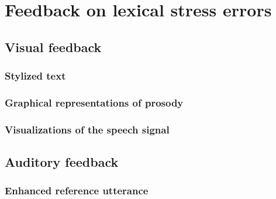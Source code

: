 %
%
\chapter{Feedback on lexical stress errors}
\label{chap:feedback}


 	\citep{Hattie2007}


%


\section{Visual feedback}
\label{sec:fb:visual}

	\subsection{Stylized text}
	\label{sec:visual:text}
	
	\subsection{Graphical representations of prosody}
	\label{sec:visual:graphics}
	
	\subsection{Visualizations of the speech signal}
	\label{sec:visual:visualizations}
	
	
	
\section{Auditory feedback}
\label{sec:fb:auditory}

	\subsection{Enhanced reference utterance}
	\label{sec:auditory:enhanced}
	
